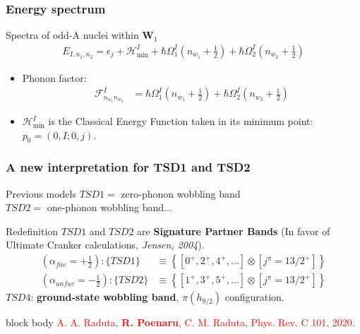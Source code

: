 \documentclass{beamer}
\begin{document}
\begin{frame}
	\frametitle{Energy spectrum}
	\begin{exampleblock}{Spectra of odd-A nuclei within $\mathbf{W}_1$}
		\begin{align}
			E_{I,n_1,n_2}=\epsilon_j+\mathcal{H}_\text{min}^I+\hbar\Omega_1^I\left(n_{w_1}+\frac{1}{2}\right)+\hbar\Omega_2^I\left(n_{w_2}+\frac{1}{2}\right)\nonumber
			\label{tsd-bands-general-spectrum}
		\end{align}
	\end{exampleblock}
	\begin{itemize}
		\item Phonon factor:
		\begin{align}
			\mathcal{F}_{n_{w_1}n_{w_2}}^I&=\hbar\Omega_1^I\left(n_{w_1}+\frac{1}{2}\right)+\hbar\Omega_2^I\left(n_{w_2}+\frac{1}{2}\right)\nonumber
		\end{align}
		\item $\mathcal{H}_\text{min}^I$ is the Classical Energy Function taken in its minimum point: $p_0=(0,I;0,j)$.
	\end{itemize}
\end{frame}

\begin{frame}
	\frametitle{A new interpretation for TSD1 and TSD2}
	\begin{exampleblock}{Previous models}
		$TSD1=$ zero-phonon wobbling band\\
		$TSD2=$ one-phonon wobbling band...
	\end{exampleblock}
	\begin{alertblock}{Redefinition}
		$TSD1$ and $TSD2$ are \textbf{Signature Partner Bands} (In favor of Ultimate Cranker calculations, \textit{Jensen, 2004}).
		\begin{align}
			\left(\alpha_{fav}=+\frac{1}{2}\right): \{TSD1\}&\equiv\left\{\left[0^+,2^+,4^+,\dots\right] \otimes [j^\pi=13/2^+]\right\}\nonumber\\
			\left(\alpha_{unfav}=-\frac{1}{2}\right): \{TSD2\}&\equiv\left\{\left[1^+,3^+,5^+,\dots\right] \otimes [j^\pi=13/2^+]\right\}\nonumber
		\end{align}
		$TSD4$: \textbf{ground-state wobbling band}, $\pi(h_{9/2})$ configuration.
	\end{alertblock}
	\begin{beamercolorbox}[rounded=true,shadow=false, wd=\linewidth,]{block body}
		\centering
		\textcolor{red}{\footnotesize{A. A. Raduta, \textbf{R. Poenaru}, C. M. Raduta, Phys. Rev. C 101, 2020.}}
	\end{beamercolorbox}
\end{frame}
\end{document}
